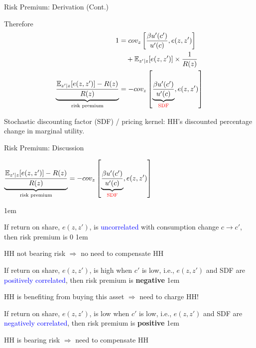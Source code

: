 \documentclass[handout, 11pt,aspectratio=43,usenames,dvipsnames]{beamer}
\newcommand{\red}[1]{\textcolor{red}{#1}}
\newcommand{\blue}[1]{\textcolor{blue}{#1}}
\let\olditemize=\itemize
\let\endolditemize=\enditemize
\renewenvironment{itemize}{\olditemize \itemsep1em}{\endolditemize}
\let\oldenumerate=\enumerate
\let\endoldenumerate=\endenumerate
\renewenvironment{enumerate}{\oldenumerate \itemsep1em}{ \endoldenumerate}
\theoremstyle{definition}
\begin{document}
\begin{frame}{Risk Premium: Derivation (Cont.)}
\label{slide:Risk_Premium__Derivation__Cont__}

Therefore
%
\begin{align}
    1
        & = cov_{z}\left[
        \frac{\beta u'(c')}{u'(c)}, e(z, z')
    \right]
    \\
        & \quad + \mathbb{E}_{z'|z}[e(z, z')] \times \frac{1}{R(z)}
    \\
    \underbrace{
    \frac{\mathbb{E}_{z'|z}[e(z, z')] - R(z)}{R(z)}
    }_{\text{risk premium}}
        & = -cov_{z}\left[
        \underbrace{
            \frac{\beta u'(c')}{u'(c)}
            }_{\text{\red{SDF}}}
        , e(z, z')
    \right]
    \end{align}
%

Stochastic discounting factor (SDF) / pricing kernel: HH's discounted percentage change in marginal utility.
\end{frame}

\begin{frame}{Risk Premium: Discussion}
\label{slide:Risk_Premium__Discussion}
\begin{center}
$ \displaystyle
    \underbrace{
    \frac{\mathbb{E}_{z'|z}[e(z, z')] - R(z)}{R(z)}
    }_{\text{risk premium}}
         = -cov_{z}\left[
        \underbrace{
            \frac{\beta u'(c')}{u'(c)}
            }_{\text{\red{SDF}}}
        , e(z, z')
    \right]
$
\end{center}
\begin{enumerate}
    \item If return on share, $ e(z, z') $, is \blue{uncorrelated} with consumption change $ c\rightarrow c' $, then risk premium is $ 0 $
    \begin{itemize}
        \item HH not bearing risk $ \Rightarrow  $ no need to compensate HH
    \end{itemize}
    \item If return on share, $ e(z, z') $, is high when $ c' $ is low, i.e., $ e(z, z') $ and SDF are \blue{positively correlated}, then risk premium is \textbf{negative}
    \begin{itemize}
        \item HH is benefiting from buying this asset $ \Rightarrow  $ need to charge HH!
    \end{itemize}
    \item If return on share, $ e(z, z') $, is low when $ c' $ is low, i.e., $ e(z, z') $ and SDF are \blue{negatively correlated}, then risk premium is \textbf{positive}
    \begin{itemize}
        \item HH is bearing risk $ \Rightarrow  $ need to compensate HH
    \end{itemize}

\end{enumerate}
\end{frame}
\end{document}
